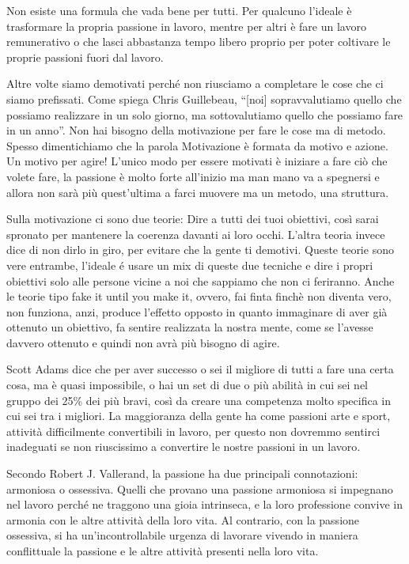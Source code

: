 \documentclass[12pt]{book} %
\begin{document}
\begin{mdframed}[linewidth=1pt]
Non esiste una formula che vada bene per tutti. Per qualcuno l'ideale è trasformare la propria
passione in lavoro, mentre per altri è fare un lavoro remunerativo o che lasci abbastanza tempo libero proprio per
poter coltivare le proprie passioni fuori dal lavoro.

Altre volte siamo demotivati perché non riusciamo a completare le cose che ci siamo prefissati. Come spiega Chris
Guillebeau, “[noi] sopravvalutiamo quello che possiamo realizzare in un solo giorno, ma sottovalutiamo quello che
possiamo fare in un anno”. Non hai bisogno della motivazione per fare le cose ma di metodo. Spesso dimentichiamo che la
parola Motivazione è formata da motivo e azione. Un motivo per agire! L'unico modo per essere motivati è iniziare a
fare ciò che volete fare, la passione è molto forte all'inizio ma man mano va a spegnersi e allora
non sarà più quest'ultima a farci muovere ma un metodo, una struttura.

Sulla motivazione ci sono due teorie: 
Dire a tutti dei tuoi obiettivi, così sarai spronato per mantenere la coerenza davanti ai loro occhi.
L'altra teoria invece dice di non dirlo in giro, per evitare che la gente ti demotivi. Queste teorie sono vere entrambe, l'ideale é usare un mix di queste due tecniche e dire i propri obiettivi solo alle persone vicine a noi che sappiamo che non ci feriranno.
Anche le teorie tipo fake it until you make it, ovvero, fai finta finchè non diventa vero, non funziona, anzi, produce l'effetto opposto in quanto immaginare di aver già ottenuto un obiettivo, fa sentire realizzata la nostra mente, come se l'avesse davvero ottenuto e quindi non avrà più bisogno di agire.

Scott Adams dice che per aver successo o sei il migliore di tutti a fare una certa cosa, ma è quasi impossibile, o hai
un set di due o più abilità in cui sei nel gruppo dei 25\% dei più bravi, così da creare una competenza molto specifica
in cui sei tra i migliori. La maggioranza della gente ha come passioni arte e sport, attività difficilmente
convertibili in lavoro, per questo non dovremmo sentirci inadeguati se non riuscissimo a convertire le nostre passioni
in un lavoro.

Secondo Robert J. Vallerand, la passione ha due principali connotazioni: armoniosa o ossessiva. Quelli che provano una
passione armoniosa si impegnano nel lavoro perché ne traggono una gioia intrinseca, e la loro professione convive in
armonia con le altre attività della loro vita. Al contrario, con la passione ossessiva, si ha
un'incontrollabile urgenza di lavorare vivendo in maniera conflittuale la passione e le altre
attività presenti nella loro vita.


\end{mdframed}
\end{document}
